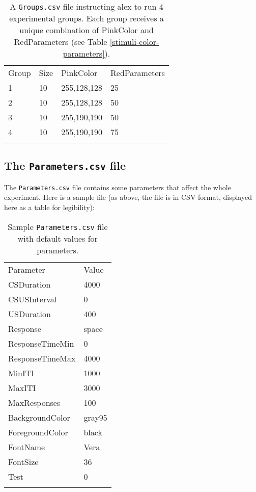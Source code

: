 \documentclass[11pt,]{article}
\renewcommand{\medskip}{}
\begin{document}
\begin{table*}[t]\begin{center}\small\begin{tabular}{@{}llll@{}}
\hline\noalign{\medskip}
Group & Size & PinkColor & RedParameters
\\\noalign{\medskip}
\hline\noalign{\medskip}
1 & 10 & 255,128,128 & 25
\\\noalign{\medskip}
2 & 10 & 255,128,128 & 50
\\\noalign{\medskip}
3 & 10 & 255,190,190 & 50
\\\noalign{\medskip}
4 & 10 & 255,190,190 & 75
\\\noalign{\medskip}
\hline
\noalign{\medskip}
\end{tabular}\caption{A \texttt{Groups.csv} file instructing alex to run 4
experimental groups. Each group receives a unique combination of
PinkColor and RedParameters (see Table \ref{stimuli-color-parameters}).
\label{subjects-color-parameters}}
\end{center}\end{table*}

\subsection{The \texttt{Parameters.csv} file}

The \texttt{Parameters.csv} file contains some parameters that affect
the whole experiment. Here is a sample file (as above, the file is in
CSV format, displayed here as a table for legibility):

\begin{table*}[t]\begin{center}\small\begin{tabular}{@{}ll@{}}
\hline\noalign{\medskip}
Parameter & Value
\\\noalign{\medskip}
\hline\noalign{\medskip}
CSDuration & 4000
\\\noalign{\medskip}
CSUSInterval & 0
\\\noalign{\medskip}
USDuration & 400
\\\noalign{\medskip}
Response & space
\\\noalign{\medskip}
ResponseTimeMin & 0
\\\noalign{\medskip}
ResponseTimeMax & 4000
\\\noalign{\medskip}
MinITI & 1000
\\\noalign{\medskip}
MaxITI & 3000
\\\noalign{\medskip}
MaxResponses & 100
\\\noalign{\medskip}
BackgroundColor & gray95
\\\noalign{\medskip}
ForegroundColor & black
\\\noalign{\medskip}
FontName & Vera
\\\noalign{\medskip}
FontSize & 36
\\\noalign{\medskip}
Test & 0
\\\noalign{\medskip}
\hline
\noalign{\medskip}
\end{tabular}\caption{Sample \texttt{Parameters.csv} file with default values for
parameters.}
\end{center}\end{table*}
\end{document}
